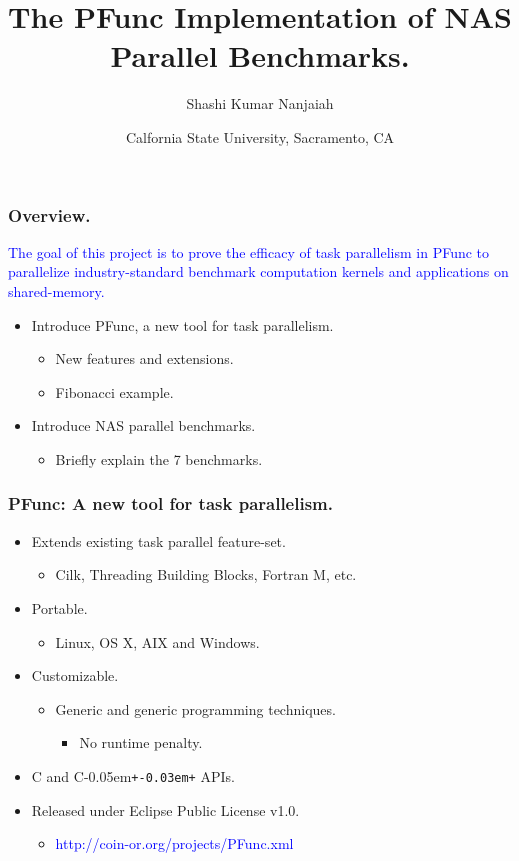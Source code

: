 \documentclass{beamer}
\title{The PFunc Implementation of NAS Parallel Benchmarks.}
\author{Shashi Kumar Nanjaiah}
\date{{\small Calfornia State University,}
{\footnotesize Sacramento, CA}}
\newcommand{\Cpp}{C\kern-0.05em\texttt{+\kern-0.03em+}}
\begin{document}
\begin{frame}
  \titlepage
\end{frame}

\begin{frame}
\frametitle{Overview.}
\begin{center}
\textcolor{blue}{The goal of this project is to prove the efficacy of task 
parallelism in PFunc to parallelize industry-standard benchmark computation 
kernels and applications on shared-memory.}
\end{center}
\begin{itemize}
\item Introduce PFunc, a new tool for task parallelism.
  \begin{itemize}
  \item New features and extensions.
  \item Fibonacci example.
  \end{itemize}
\item Introduce NAS parallel benchmarks.
  \begin{itemize}
  \item Briefly explain the 7 benchmarks.
  \end{itemize}
\end{itemize}
\end{frame}

\begin{frame}
\frametitle{PFunc: A new tool for task parallelism.}
\begin{itemize}
\item Extends existing task parallel feature-set. 
  \begin{itemize}
  \item Cilk, Threading Building Blocks, Fortran M, etc.
  \end{itemize}
\item Portable.
  \begin{itemize}
  \item Linux, OS X, AIX and Windows.
  \end{itemize}
\item Customizable.
  \begin{itemize}
  \item Generic and generic programming techniques.
    \begin{itemize}
    \item No runtime penalty.
    \end{itemize}
  \end{itemize}
\item C and \Cpp{} APIs.
\item Released under Eclipse Public License v1.0.
  \begin{itemize}
  \item \textcolor{blue}{http://coin-or.org/projects/PFunc.xml}
  \end{itemize}
\end{itemize}
\end{frame}
\end{document}
